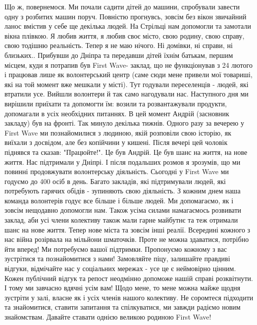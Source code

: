Що ж, повернемося.  
Ми почали садити дітей до машини, спробували завести одну з розбитих машин поруч. Повністю прогнувсь, зовсім без вікон звичайний ланос вмістив у себе ще декілька людей. На Стрільці нам допомогли та замотали вікна плівкою. 
Я любив життя, я любив своє місто, свою родину, свою справу, свою тодішню реальність. Тепер я не маю нічого. Ні домівки, ні справи, ні близьких.. 
Прибувши до Дніпра та передавши дітей їхнім батькам, першим місцем, куди я потрапив був First Wave- заклад, що не функціонував з 24 лютого і працював лише як волонтерський центр (саме сюди мене привели мої товариші, які на той момент вже мешкали у місті). Тут годували переселенців - людей, які втратили усе. Вийшли волонтери й так само нагодували нас. Наступного дня ми вирішили приїхати та допомогти їм: возили та розвантажували продукти, допомагали в усіх необхідних питаннях. В цей момент Андрій (засновник закладу) був на фронті. Так минуло декілька тижнів. 
Одного разу за вечерею у First Wave ми познайомилися з людиною, якій розповіли свою історію, як виїхали з досвідом, але без копійчини у кишені. Після вечері цей чоловік піднявся та сказав: "Працюйте!". Це був Андрій. 
Це був шанс на життя, на нове життя. Нас підтримали у Дніпрі. І після подальших розмов я зрозумів, що ми повинні продовжувати волонтерську діяльність. 
Сьогодні у First Wave ми годуємо до 400 осіб в день. Багато закладів, які підтримували людей, які потребують гарячих обідів - зупиняють свою діяльність. З кожним днем наша команда волонтерів годує все більше і більше людей. Ми допомагаємо, як і зовсім нещодавно допомогли нам. Також усіма силами намагаємось розвивати заклад, аби усі члени колективу також мали гарне майбутнє та теж отримали шанс на нове життя. 
Тепер нове міста та зовсім інші реалії. Всередині кожного з нас війна розірвала на мільйони шматочків. Проте не можна здаватися, потрібно йти вперед! Ми потребуємо вашої підтримки. Пропонуємо кожному з вас зустрітися та познайомитися з нами! Замовляйте піцу, залишайте правдиві відгуки, відмічайте нас у соціальних мережах - усе це є неймовірно цінним. Кожен публічний відгук та репост неодмінно допоможе нашій справі розквітнути. І тому ми завчасно вдячні усім вам! 
Щодо мене, то мене можна майже щодня зустріти у залі, власне як і усіх членів нашого колективу. Не соромтеся підходити та знайомитися, ставити запитання та спілкуватися, ми завжди радіємо новим знайомствам. Давайте ставати однією великою родиною First Wave!
